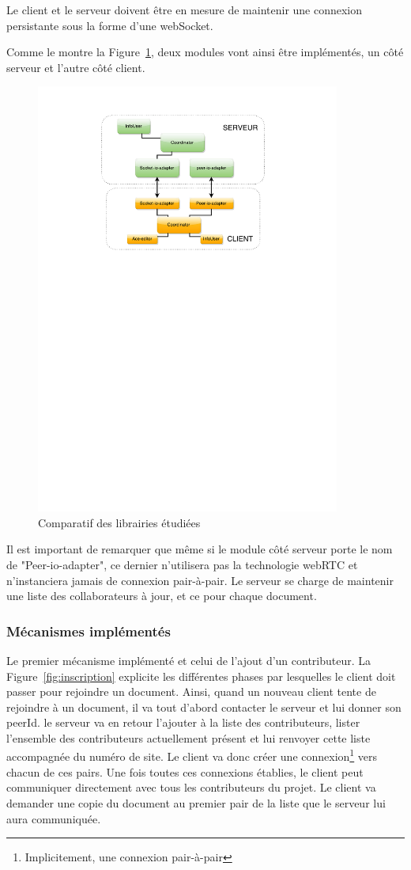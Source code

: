 \documentclass{tnreport}
\begin{document}
Le client et le serveur doivent être en mesure de maintenir une connexion persistante sous la forme d'une webSocket.

Comme le montre la Figure~\ref{fig:archi-p2p}, deux modules vont ainsi être implémentés, un côté serveur et l'autre côté client.

\begin{figure}[!h]
  \centering
  \includegraphics[width=10cm]{figures/archi-p2p}
  \caption{Comparatif des librairies étudiées}
  \label{fig:archi-p2p}
\end{figure}

Il est important de remarquer que même si le module côté serveur porte le nom de "Peer-io-adapter", ce dernier n'utilisera pas la technologie webRTC et n'instanciera jamais de connexion pair-à-pair. Le serveur se charge de maintenir une liste des collaborateurs à jour, et ce pour chaque document. 

\subsubsection{Mécanismes implémentés}

Le premier mécanisme implémenté et celui de l'ajout d'un contributeur. La Figure~\ref{fig:inscription} explicite les différentes phases par lesquelles le client doit passer pour rejoindre un document. Ainsi, quand un nouveau client tente de rejoindre à un document, il va tout d'abord contacter le serveur et lui donner son peerId. le serveur va en retour l'ajouter à la liste des contributeurs, lister l'ensemble des contributeurs actuellement présent et lui renvoyer cette liste accompagnée du numéro de site. Le client va donc créer une connexion\footnote{Implicitement, une connexion pair-à-pair} vers chacun de ces pairs. Une fois toutes ces connexions établies, le client peut communiquer directement avec tous les contributeurs du projet. Le client va demander une copie du document au premier pair de la liste que le serveur lui aura communiquée.
\end{document}
